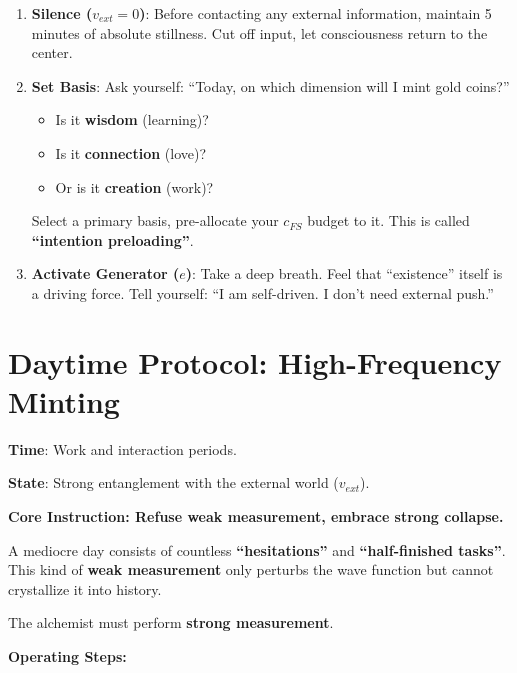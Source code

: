 \begin{enumerate}
\item \textbf{Silence ($v_{ext} = 0$)}: Before contacting any external information, maintain 5 minutes of absolute stillness. Cut off input, let consciousness return to the center.

\item \textbf{Set Basis}: Ask yourself: ``Today, on which dimension will I mint gold coins?''

    \begin{itemize}
    \item Is it \textbf{wisdom} (learning)?

    \item Is it \textbf{connection} (love)?

    \item Or is it \textbf{creation} (work)?
    \end{itemize}

    Select a primary basis, pre-allocate your $c_{FS}$ budget to it. This is called \textbf{``intention preloading''}.

\item \textbf{Activate Generator ($e$)}: Take a deep breath. Feel that ``existence'' itself is a driving force. Tell yourself: ``I am self-driven. I don't need external push.''
\end{enumerate}

\section{Daytime Protocol: High-Frequency Minting}

\textbf{Time}: Work and interaction periods.

\textbf{State}: Strong entanglement with the external world ($v_{ext}$).

\textbf{Core Instruction: Refuse weak measurement, embrace strong collapse.}

A mediocre day consists of countless \textbf{``hesitations''} and \textbf{``half-finished tasks''}. This kind of \textbf{weak measurement} only perturbs the wave function but cannot crystallize it into history.

The alchemist must perform \textbf{strong measurement}.

\textbf{Operating Steps:}

